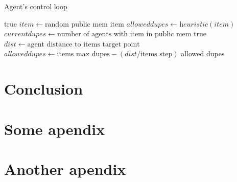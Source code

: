 \documentclass{UoYCSproject}
\begin{document}
\begin{algorithm}
\caption{Agent's control loop}
\label{Agent_Control_Loop}
\begin{algorithmic}[1]
\State {}
\State
{}
\State {}
\State \Return true
\EndIf
\State
\State $item \gets \text{random public mem item}$
\State $allowed dupes \gets \textit{heuristic}(item)$
\State $current dupes \gets \text{number of agents with item in public mem}$
\State
{}
\State {}
\State {}
\EndIf
\State
\State \Return true
\EndProcedure
\State
{}
\State $dist  \gets \text{agent distance to items target point}$
\State $allowed dupes \gets \text{items max dupes} - (dist / \text{items step})$
\State
{}
\State {}
\Else
\State \Return allowed dupes
\EndIf
\EndProcedure
\end{algorithmic}
\end{algorithm}




\chapter{Conclusion}
\label{cha:conclusion}


\appendix
\chapter{Some apendix}


\chapter{Another apendix}
\end{document}
